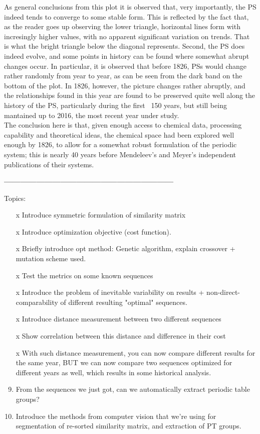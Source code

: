 \documentclass[article]{article}
\begin{document}
As general conclusions from this plot it is observed that, very importantly, the PS indeed tends to converge to some stable form. This is reflected by the fact that, as the reader goes up observing the lower triangle, horizontal lines form with incresingly higher values, with no apparent significant variation on trends. That is what the bright triangle below the diagonal represents.
Second, the PS does indeed evolve, and some points in history can be found where somewhat abrupt changes occur. In particular, it is observed that before 1826, PSs would change rather randomly from year to year, as can be seen from the dark band on the bottom of the plot. In 1826, however, the picture changes rather abruptly, and the relationships found in this year are found to be preserved quite well along the history of the PS, particularly during the first ~150 years, but still being mantained up to 2016, the most recent year under study.\\
The conclusion here is that, given enough access to chemical data, processing capability and theoretical ideas, the chemical space had been explored well enough by 1826, to allow for a somewhat robust formulation of the periodic system; this is nearly 40 years before Mendeleev's and Meyer's independent publications of their systems.




\textbf{---------------------------------------------------------------}


Topics:

\begin{enumerate}
	\item [x] Introduce symmetric formulation of similarity matrix
	\item [x] Introduce optimization objective (cost function).
	\item [x] Briefly introduce opt method: Genetic algorithm, explain crossover + mutation scheme used.
	\item [x] Test the metrics on some known sequences
	\item [x] Introduce the problem of inevitable variability on results + non-direct-comparability of different resulting "optimal" sequences.
	\item [x] Introduce distance measurement between two different sequences
	\item [x] Show correlation between this distance and difference in their cost
	\item [x] With such distance measurement, you can now compare different results for the same year, BUT we can now compare two sequences optimized for different years as well, which results in some historical analysis.
	\item From the sequences we just got, can we automatically extract periodic table groups?
	\item Introduce the methods from computer vision that we're using for segmentation of re-sorted similarity matrix, and extraction of PT groups.
	
	
\end{enumerate}
\end{document}
